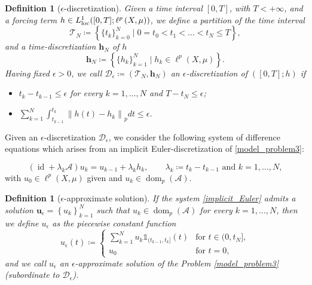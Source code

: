\documentclass[journal]{article}
\theoremstyle{nonitalic}
\theoremstyle{nonitalic}
\theoremstyle{plain} %
\newtheorem{definition}[theorem]{Definition}
\numberwithin{equation}{section}
\newcommand{\dom}{\operatorname{dom}}
\begin{document}
\begin{definition}[$\epsilon$-discretization]\label{def:epsilon-discretization}
	Given a time interval $[0,T]$, with $T<+\infty$, and a forcing term $h \in L^1_{\rm{loc}}([0,T] ; \ell^p\left(X,\mu\right))$, we define a partition of the time interval
	$$
	\mathcal{T}_N \coloneqq \left\{ \{t_k\}_{k=0}^N \mid 0= t_0<t_1<\ldots<t_N\leq T \right\},
	$$
	and a time-discretization $\boldsymbol{h}_N$ of $h$
	$$
	\boldsymbol{h}_N\coloneqq\left\{ \{h_k\}_{k=1}^{N} \mid h_k \in \ell^p(X,\mu)\right\}.
	$$
	Having fixed $\epsilon >0$, we call $\mathcal{D}_\epsilon\coloneqq (\mathcal{T}_N,\boldsymbol{h}_N)$ an \emph{$\epsilon$-discretization} of $([0,T]; h)$ if
	\begin{itemize}
		\item $t_k-t_{k-1} \leq \epsilon$ for every $k=1,\ldots, N$ and $T- t_N \leq \epsilon$;
		\item $\sum_{k=1}^{N} \int_{t_{k-1}}^{t_{k}} \left\| h(t) - h_k \right\|_p dt \leq \epsilon$.
	\end{itemize}
\end{definition}


Given an $\epsilon$-discretization $\mathcal{D}_\epsilon$, we consider the following system of difference equations which arises from an implicit Euler-discretization of \eqref{model_problem3}:

\begin{equation}\label{implicit_Euler}
	(\operatorname{id} + \lambda_k \mathcal{A} )u_k= u_{k-1} + \lambda_k h_k, \qquad
	\lambda_k\coloneqq t_k - t_{k-1}\mbox{ and } k=1,\ldots,N,
\end{equation}
with $u_0\in\ell^p(X,\mu)$ given and $u_k \in \dom_p(\mathcal{A})$. 

\begin{definition}[$\epsilon$-approximate solution]\label{epsilon-approximation}
If the system \eqref{implicit_Euler} admits a solution $\boldsymbol{u}_\epsilon =\left\{u_k\right\}_{k=1}^N$ such that $u_k\in \dom_p(\mathcal{A})$ for every $k=1,\ldots, N$, then we define $u_\epsilon$ as the piecewise constant function
\begin{equation}\label{epsilon_approximation}
u_\epsilon(t)\coloneqq \begin{cases}
	\sum_{k=1}^N u_k\mathds{1}_{(t_{k-1},t_k]}(t) & \mbox{for } t\in (0, t_N],\\
	u_0 & \mbox{for } t=0,
\end{cases}
\end{equation}
and we call $u_\epsilon$ an \emph{$\epsilon$-approximate solution} of the Problem \eqref{model_problem3} (subordinate to $\mathcal{D}_\epsilon$).
\end{definition}
\end{document}
